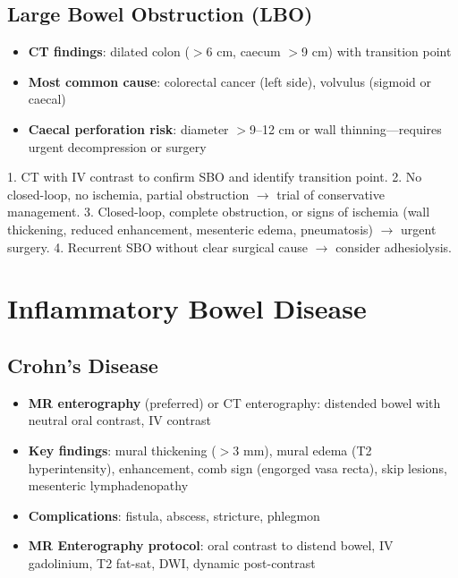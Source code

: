 \subsection{Large Bowel Obstruction (LBO)}
\begin{itemize}
  \item \textbf{CT findings}: dilated colon ($>$6 cm, caecum $>$9 cm) with transition point
  \item \textbf{Most common cause}: colorectal cancer (left side), volvulus (sigmoid or caecal)
  \item \textbf{Caecal perforation risk}: diameter $>$9--12 cm or wall thinning---requires urgent decompression or surgery
\end{itemize}

\begin{pearlbox}
1. CT with IV contrast to confirm SBO and identify transition point.
2. No closed-loop, no ischemia, partial obstruction $\rightarrow$ trial of conservative management.
3. Closed-loop, complete obstruction, or signs of ischemia (wall thickening, reduced enhancement, mesenteric edema, pneumatosis) $\rightarrow$ urgent surgery.
4. Recurrent SBO without clear surgical cause $\rightarrow$ consider adhesiolysis.
\end{pearlbox}

\section{Inflammatory Bowel Disease}

\subsection{Crohn's Disease}
\begin{itemize}
  \item \textbf{MR enterography} (preferred) or CT enterography: distended bowel with neutral oral contrast, IV contrast
  \item \textbf{Key findings}: mural thickening ($>$3 mm), mural edema (T2 hyperintensity), enhancement, comb sign (engorged vasa recta), skip lesions, mesenteric lymphadenopathy
  \item \textbf{Complications}: fistula, abscess, stricture, phlegmon
  \item \textbf{MR Enterography protocol}: oral contrast to distend bowel, IV gadolinium, T2 fat-sat, DWI, dynamic post-contrast
\end{itemize}

